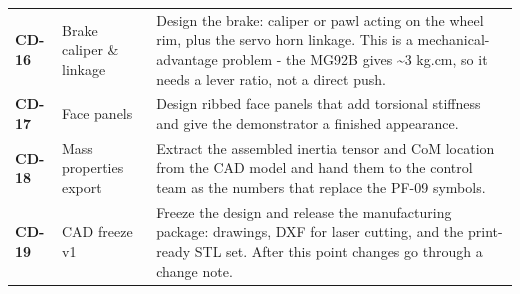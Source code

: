 {\begin{longtable}{@{}L{1.1cm} L{3.0cm} L{11.0cm}@{}}
\textbf{CD-16} & Brake caliper \& linkage & Design the brake: caliper or pawl acting on the wheel rim, plus the servo horn linkage. This is a mechanical-advantage problem - the MG92B gives \textasciitilde{}3 kg.cm, so it needs a lever ratio, not a direct push. \\[2pt]
\textbf{CD-17} & Face panels & Design ribbed face panels that add torsional stiffness and give the demonstrator a finished appearance. \\[2pt]
\textbf{CD-18} & Mass properties export & Extract the assembled inertia tensor and CoM location from the CAD model and hand them to the control team as the numbers that replace the PF-09 symbols. \\[2pt]
\textbf{CD-19} & CAD freeze v1 & Freeze the design and release the manufacturing package: drawings, DXF for laser cutting, and the print-ready STL set. After this point changes go through a change note. \\[2pt]
\end{longtable}
}

